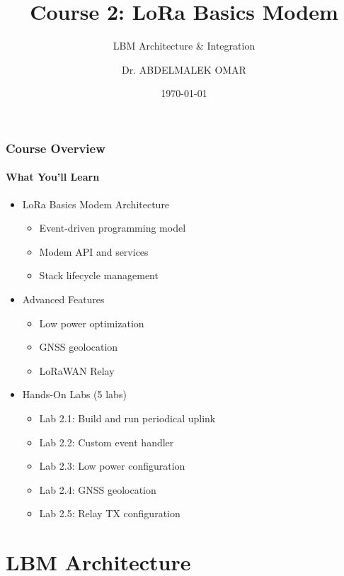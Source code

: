 \documentclass{beamer}
\title{Course 2: LoRa Basics Modem}
\subtitle{LBM Architecture \& Integration}
\author{Dr. ABDELMALEK OMAR}
\date{\today}
\institute{USP Zephyr Training Series\\Copyright \copyright{} 2025 Dr. ABDELMALEK OMAR}
\begin{document}
\begin{frame}[plain,t]
\titlepage
\end{frame}

\begin{frame}
\frametitle{Course Overview}
\framesubtitle{What You'll Learn}
\begin{itemize}
    \item LoRa Basics Modem Architecture
    \begin{itemize}
        \item Event-driven programming model
        \item Modem API and services
        \item Stack lifecycle management
    \end{itemize}
    \item Advanced Features
    \begin{itemize}
        \item Low power optimization
        \item GNSS geolocation
        \item LoRaWAN Relay
    \end{itemize}
    \item Hands-On Labs (5 labs)
    \begin{itemize}
        \item Lab 2.1: Build and run periodical uplink
        \item Lab 2.2: Custom event handler
        \item Lab 2.3: Low power configuration
        \item Lab 2.4: GNSS geolocation
        \item Lab 2.5: Relay TX configuration
    \end{itemize}
\end{itemize}
\end{frame}

\section{LBM Architecture}
\end{document}
